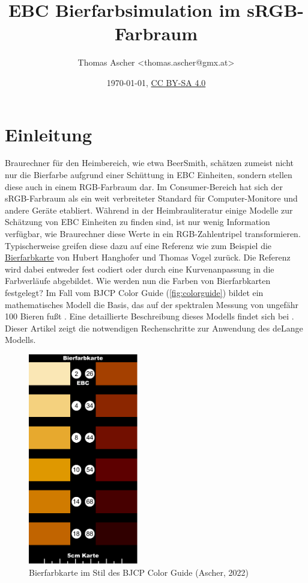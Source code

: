 \documentclass[10pt,a4paper,DIV=12,parskip=half]{scrarticle}
\title{EBC Bierfarbsimulation im sRGB-Farbraum}
\author{Thomas Ascher <thomas.ascher@gmx.at>}
\date{\today, \href{http://creativecommons.org/licenses/by-sa/4.0/}{CC BY-SA 4.0}}
\begin{document}
\maketitle

\section*{Einleitung}

Braurechner für den Heimbereich, wie etwa BeerSmith, schätzen zumeist nicht nur die Bierfarbe aufgrund einer Schüttung in EBC Einheiten, sondern stellen diese auch in einem RGB-Farbraum dar. Im Consumer-Bereich hat sich der sRGB-Farbraum als ein weit verbreiteter Standard für Computer-Monitore und andere Geräte etabliert. Während in der Heimbrauliteratur einige Modelle zur Schätzung von EBC Einheiten zu finden sind, ist nur wenig Information verfügbar, wie Braurechner diese Werte in ein RGB-Zahlentripel transformieren. Typischerweise greifen diese dazu auf eine Referenz wie zum Beispiel die \href{https://www.bierfarbkarte.de}{Bierfarbkarte} von Hubert Hanghofer und Thomas Vogel zurück. Die Referenz wird dabei entweder fest codiert oder durch eine Kurvenanpassung in die Farbverläufe abgebildet. Wie werden nun die Farben von Bierfarbkarten festgelegt? Im Fall vom BJCP Color Guide (\autoref{fig:colorguide}) bildet ein mathematisches Modell die Basis, das auf der spektralen Messung von ungefähr 100 Bieren fußt \parencite{BJCP}. Eine detaillierte Beschreibung dieses Modells findet sich bei \cite{deLange2016}. Dieser Artikel zeigt die notwendigen Rechenschritte zur Anwendung des deLange Modells.

\begin{figure}[H]
	\centering
	\includegraphics[width=4.8cm]{color_guide.pdf}
	\caption{Bierfarbkarte im Stil des BJCP Color Guide (Ascher, 2022)}
	\label{fig:colorguide}
\end{figure}
\end{document}
